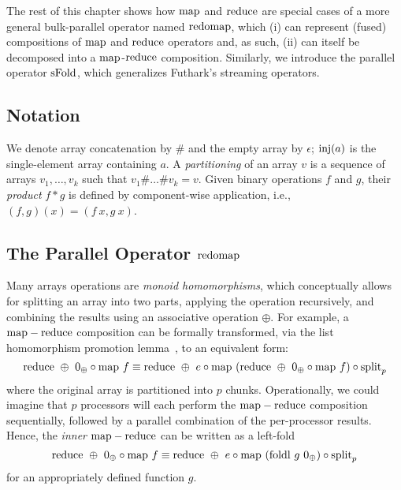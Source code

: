 
The rest of this chapter shows how $\mathrm{map}{}$ and $\mathrm{reduce}{}$ are
special cases of a more general bulk-parallel operator named
$\mathrm{redomap}{}$, which (i) can represent (fused) compositions of
$\mathrm{map}{}$ and $\mathrm{reduce}{}$ operators and, as such, (ii) can itself be
decomposed into a $\mathrm{map}{}$-$\mathrm{reduce}{}$ composition.  Similarly, we
introduce the parallel operator $\mathrm{sFold}{}$, which generalizes
Futhark's streaming operators.

\subsection{Notation}

We denote array concatenation by $\#$ and the empty array by $\epsilon$;
$\mathrm{inj}(a)$ is the single-element array containing $a$.
A \emph{partitioning} of an array $v$ is a sequence of arrays $v_1, \ldots, v_k$ such
that $v_1 \# \ldots \# v_k = v$.
%
Given binary operations $f$ and $g$, their \emph{product} $f * g$ is defined by
component-wise application, i.e., $(f, g) (x) = (f~x, g~x)$.
%
%

\subsection{The Parallel Operator $\mathrm{redomap}$}
\label{sec:formal-redomap}

Many arrays operations are \emph{monoid homomorphisms}, which
conceptually allows for splitting an array into two parts, applying
the operation recursively, and combining the results using an
associative operation $\oplus$.  For example, a $\mathrm{map}-\mathrm{reduce}$
composition can be formally transformed, via the list homomorphism
promotion lemma~\cite{BirdListTh}, to an equivalent form:
\[
  \mathrm{reduce}~\oplus~0_{\oplus} \circ \mathrm{map}~f \equiv \mathrm{reduce}~\oplus~e \circ \mathrm{map}~(\mathrm{reduce}~\oplus~0_{\oplus} \circ \mathrm{map}~f) \circ \textrm{split}_{p}
\]
where the original array is partitioned into $p$ chunks.
Operationally, we could imagine that $p$ processors will each perform
the $\mathrm{map}-\mathrm{reduce}$ composition sequentially, followed by a parallel
combination of the per-processor results.  Hence, the \textit{inner}
$\mathrm{map}-\mathrm{reduce}$ can be written as a left-fold
\[
  \mathrm{reduce}~\oplus~0_{\oplus} \circ \mathrm{map}~f \equiv \mathrm{reduce}~\oplus~e \circ \mathrm{map}~(\mathrm{foldl}~g~0_{\oplus}) \circ \textrm{split}_{p}
\]
for an appropriately defined function $g$.

